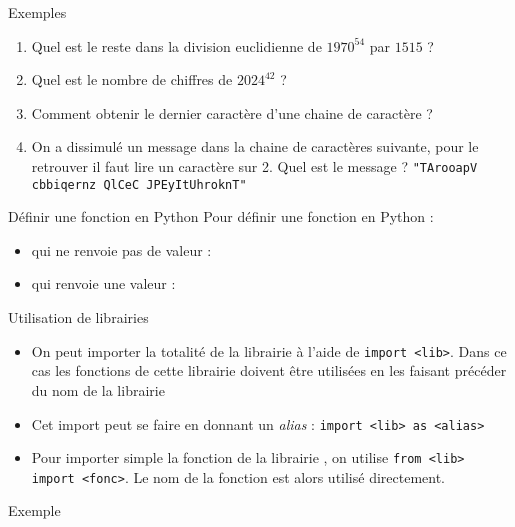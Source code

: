\documentclass[10pt]{beamer}
\begin{document}
\begin{frame}[fragile]{\Ctitle}{\stitle}
	\begin{exampleblock}{Exemples}
		\begin{enumerate}
			\item<1-> Quel est le reste dans la division euclidienne de $1970^{54}$ par $1515$ ?
			\item<2-> Quel est le nombre de chiffres de $2024^{42}$ ?
			\item<3-> Comment obtenir le dernier caractère d'une chaine de caractère ?
			\item<4-> On a dissimulé un message dans la chaine de caractères suivante, pour le retrouver il faut lire un caractère sur 2. Quel est le message ?
				\texttt{"TArooapV cbbiqernz QlCeC JPEyItUhroknT"}
		\end{enumerate}
	\end{exampleblock}
\end{frame}

\begin{frame}[fragile]{\Ctitle}{\stitle}
	\begin{alertblock}{Définir une fonction en Python}
		Pour définir une fonction en Python :
		\begin{itemize}
			\item<2-> qui ne renvoie pas de valeur :
			\item<2-> qui renvoie une valeur :
				\	
		\end{itemize}
	\end{alertblock}
\end{frame}

\begin{frame}[fragile]{\Ctitle}{\stitle}
	\begin{alertblock}{Utilisation de librairies}
		\begin{itemize}
			\item<1-> On peut importer la totalité de la librairie  à l'aide de \texttt{import <lib>}. Dans ce cas les fonctions de cette librairie doivent être utilisées en les faisant précéder du nom de la librairie
			\item<2-> Cet import peut se faire en donnant un \textit{alias} : \texttt{import <lib> as <alias>}
			\item<3-> Pour importer simple la fonction  de la librairie , on utilise \texttt{from <lib> import <fonc>}. Le nom de la fonction est alors utilisé directement.
		\end{itemize}
	\end{alertblock}
	\begin{exampleblock}{Exemple}
		\onslide<4-> 
		\onslide<5-> 
	\end{exampleblock}
\end{frame}
\end{document}
